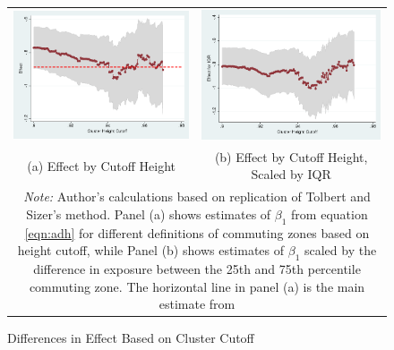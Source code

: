 \begin{figure}\centering
\caption{Differences in Effect Based on Cluster Cutoff \label{fig:cutoff_dist}}
\begin{tabular}{cc}

\includegraphics[scale=.35]{./figures/cutoff_1990_1.png} & 
\includegraphics[scale=.35]{./figures/cutoff_iqr_1990_1.png}\\
(a) Effect by Cutoff Height & (b) Effect by Cutoff Height, Scaled by IQR \\
\multicolumn{2}{p{6.5in}}{\footnotesize \emph{Note:} Author's calculations based on replication of Tolbert and Sizer's method. Panel (a) shows estimates of $\beta_1$ from equation \ref{eqn:adh} for different definitions of commuting zones based on height cutoff, while Panel (b) shows estimates of $\beta_1$ scaled by the difference in exposure between the 25th and 75th percentile commuting zone. The horizontal line in panel (a) is the main estimate from \citet{ADH2013}}
\end{tabular}
\end{figure}

